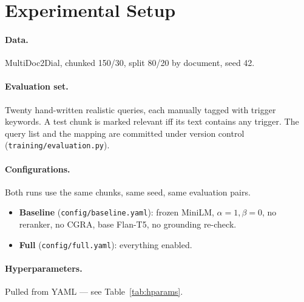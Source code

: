 \documentclass[11pt,a4paper]{article}
\begin{document}
\section{Experimental Setup}
\label{sec:eval}

\paragraph{Data.} MultiDoc2Dial, chunked 150/30, split 80/20 by document, seed 42.

\paragraph{Evaluation set.} Twenty hand-written realistic queries, each manually tagged with trigger keywords. A test chunk is marked relevant iff its text contains any trigger. The query list and the mapping are committed under version control (\texttt{training/evaluation.py}).

\paragraph{Configurations.} Both runs use the same chunks, same seed, same evaluation pairs.

\begin{itemize}
\itemsep 1pt
\item \textbf{Baseline} (\texttt{config/baseline.yaml}): frozen MiniLM, $\alpha{=}1,\beta{=}0$, no reranker, no CGRA, base Flan-T5, no grounding re-check.
\item \textbf{Full} (\texttt{config/full.yaml}): everything enabled.
\end{itemize}

\paragraph{Hyperparameters.} Pulled from YAML --- see Table~\ref{tab:hparams}.
\end{document}
